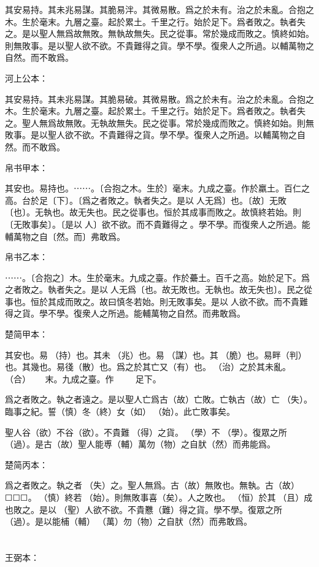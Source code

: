 \documentclass[a5paper]{ctexbook}
\begin{document}
    其安易持。其未兆易謀。其脆易泮。其微易散。爲之於未有。治之於未亂。合抱之木。生於毫末。九層之臺。起於累土。千里之行。始於足下。爲者敗之。執者失之。是以聖人無爲故無敗。無執故無失。民之從事。常於幾成而敗之。慎終如始。則無敗事。是以聖人欲不欲。不貴難得之貨。學不學。復衆人之所過。以輔萬物之自然。而不敢爲。

    河上公本：

    其安易持。其未兆易謀。其脆易破。其微易散。爲之於未有。治之於未亂。合抱之木。生於毫末。九層之臺。起於累土。千里之行。始於足下。爲者敗之。執者失之。聖人無爲故無敗。无執故無失。民之從事。常於幾成而敗之。慎終如始。則無敗事。是以聖人欲不欲。不貴難得之貨。學不學。復衆人之所過。以輔萬物之自然。而不敢爲。

    帛书甲本：

    其安也。易持也。⋯⋯。〔合抱之木。生於〕毫末。九成之臺。作於羸土。百仁之高。台於足〔下〕。〔爲之者敗之。執者失之。是以𦔻人无爲〕也。〔故〕无敗〔也〕。无執也。故无失也。民之從事也。恒於其成事而敗之。故慎終若始。則〔无敗事矣〕。〔是以𦔻人〕欲不欲。而不貴難得之𦠽。學不學。而復衆人之所過。能輔萬物之自〔然。而〕弗敢爲。

    帛书乙本：

    ⋯⋯。〔合抱之〕木。生於毫末。九成之臺。作於虆土。百千之高。始於足下。爲之者敗之。執者失之。是以𦔻人无爲〔也。故无敗也。无執也。故无失也〕。民之從事也。恒於其成而敗之。故曰慎冬若始。則无敗事矣。是以𦔻人欲不欲。而不貴難得之貨。學不學。復衆人之所過。能輔萬物之自然。而弗敢爲。

    楚简甲本：

    其安也。易𣏔（持）也。其未󶵆（兆）也。易𢘃（謀）也。其󶵇（脆）也。易畔（判）也。其幾也。易㣤（散）也。爲之於其亡又（有）也。𥿆（治）之於其未亂。𣌭（合）☐☐☐☐☐☐末。九成之臺。作☐☐☐☐☐☐☐☐☐足下。

    爲之者敗之。執之者遠之。是以聖人亡爲古（故）亡敗。亡執古（故）亡󶴡（失）。臨事之紀。誓（慎）冬（終）女（如）󶴢（始）。此亡敗事矣。

    聖人谷（欲）不谷（欲）。不貴難󶴫（得）之貨。𡥈（學）不𡥈（學）。復眾之所󶴬（過）。是古（故）聖人能尃（輔）萬勿（物）之自肰（然）而弗能爲。

    楚简丙本：

    爲之者敗之。執之者󶴡（失）之。聖人無爲。古（故）無敗也。無執。古（故）☐☐☐。󶴤（慎）終若󶴪（始）。則無敗事喜（矣）。人之敗也。𠄨（恒）於其𠭯（且）成也敗之。是以☐（聖）人欲不欲。不貴戁（難）得之貨。學不學。復眾之所󶴭（過）。是以能㭪（輔）󼧕（萬）勿（物）之自肰（然）而弗敢爲。

    \chapter{}
    王弼本：
\end{document}
